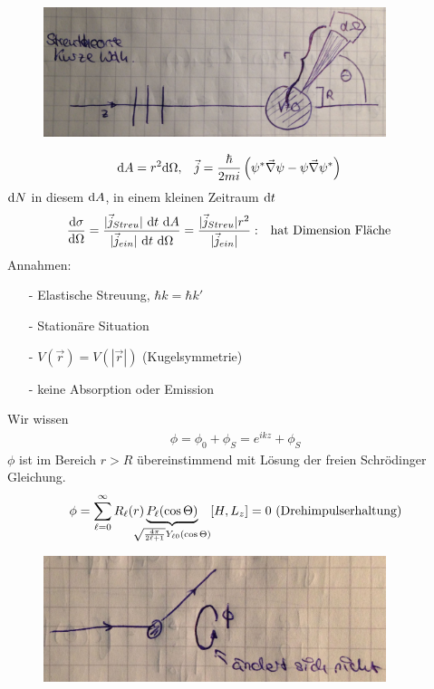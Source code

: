 	\begin{figure} [h]
		\begin{center}
			\includegraphics[width=10cm]{Stat_Streuproblem_Wirkungsquerschnitt7}
		\end{center}
	\end{figure}
		\begin{align*}
			\mathrm{d} A &= r^2 \mathrm{d} \Omega ,& 
			\vec{j} &= \frac{\hbar}{2 m i} \left(\psi^* \vec{\nabla} \psi - \psi \vec{\nabla} \psi^* \right)
		\end{align*}
	$\mathrm{d} N$ in diesem $\mathrm{d} A$, in einem kleinen Zeitraum $\mathrm{d} t$ 
		\begin{align*}
			\frac{\mathrm{d} \sigma}{\mathrm{d} \Omega}
			&= \frac{|\vec{j}_{Streu}| ~\mathrm{d} t ~ \mathrm{d} A}{ |\vec{j}_{ein}| ~\mathrm{d} t ~ \mathrm{d} \Omega}
			=\frac{|\vec{j}_{Streu}| r^2}{|\vec{j}_{ein}|} :&
			&\text{hat Dimension Fläche}
		\end{align*}
	Annahmen:
		\begin{itemize}
			\item[-] 	Elastische Streuung, $\hbar k = \hbar k'$
			\item[-]	Stationäre Situation
			\item[-]	$V(\vec{r}) = V(|\vec{r}|)$ (Kugelsymmetrie)
			\item[-]	keine Absorption oder Emission
		\end{itemize}
	Wir wissen
		\begin{align*}
			\phi = \phi_0 + \phi_S = e^{i k z} + \phi_S
		\end{align*}
	$\phi$ ist im Bereich $r>R$ übereinstimmend mit Lösung der freien Schrödinger Gleichung.
		\begin{align*}
			\phi = \sum_{\ell = 0}^{\infty} R_\ell (r) 
			\underbrace{P_\ell (\cos \Theta)}_{\mathclap{\sqrt{\frac{4 \pi}{2\ell+1}} 
					Y_{\ell 0}(\cos \Theta)}} 
			& &[H, L_z] = 0 ~(\text{Drehimpulserhaltung})
		\end{align*}	
	\begin{figure} [h]
		\begin{center}
			\includegraphics[width=10cm]{Stat_Streuproblem_Wirkungsquerschnitt8}
		\end{center}
	\end{figure}
